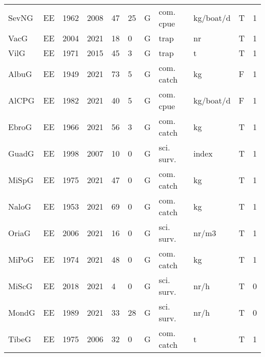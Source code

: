 \begin{table}[ht]
\begin{tabular}{p{1cm}p{1cm}p{1cm}p{1cm}p{0.8cm}p{0.8cm}p{1cm}p{2cm}p{2cm}p{1cm}p{1cm}}
  SevNG & EE & 1962 & 2008 & 47 & 25 & G & com. cpue & kg/boat/d & T & 1 \\ 
  VacG & EE & 2004 & 2021 & 18 & 0 & G & trap & nr & T & 1 \\ 
  VilG & EE & 1971 & 2015 & 45 & 3 & G & trap & t & T & 1 \\ 
  AlbuG & EE & 1949 & 2021 & 73 & 5 & G & com. catch & kg & F & 1 \\ 
  AlCPG & EE & 1982 & 2021 & 40 & 5 & G & com. cpue & kg/boat/d & F & 1 \\ 
  EbroG & EE & 1966 & 2021 & 56 & 3 & G & com. catch & kg & T & 1 \\ 
  GuadG & EE & 1998 & 2007 & 10 & 0 & G & sci. surv. & index & T & 1 \\ 
  MiSpG & EE & 1975 & 2021 & 47 & 0 & G & com. catch & kg & T & 1 \\ 
  NaloG & EE & 1953 & 2021 & 69 & 0 & G & com. catch & kg & T & 1 \\ 
  OriaG & EE & 2006 & 2021 & 16 & 0 & G & sci. surv. & nr/m3 & T & 1 \\ 
  MiPoG & EE & 1974 & 2021 & 48 & 0 & G & com. catch & kg & T & 1 \\ 
  MiScG & EE & 2018 & 2021 & 4 & 0 & G & sci. surv. & nr/h & T & 0 \\ 
  MondG & EE & 1989 & 2021 & 33 & 28 & G & sci. surv. & nr/h & T & 0 \\ 
  TibeG & EE & 1975 & 2006 & 32 & 0 & G & com. catch & t & T & 1 \\ 
   \hline
\end{tabular}
\end{table}

